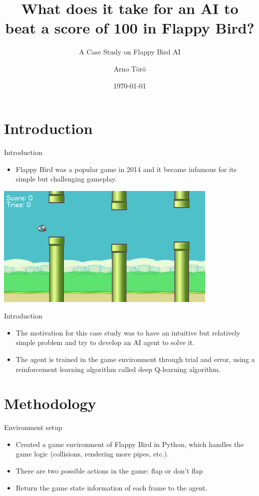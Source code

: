 \documentclass[xcolor=dvipsnames]{beamer}
\title[A Case Study on Flappy Bird AI]{What does it take for an AI to beat a score of 100 in Flappy Bird?}
\subtitle{A Case Study on Flappy Bird AI}
\author{Arno Törö}
\date{\today}
\institute[]{LUT University}
\begin{document}
\begin{frame}
    \titlepage
\end{frame}

\begin{frame}
    \tableofcontents
\end{frame}


\section{Introduction}
\begin{frame}{Introduction}
    \begin{itemize}
        \item Flappy Bird was a popular game in 2014 and it became infamous for its simple but challenging gameplay.
    \end{itemize}
    \begin{center}
        \vspace{0.3cm} %
        \includegraphics[width=0.8\textwidth]{resources/flappy_bird.png}
    \end{center}
\end{frame}

\begin{frame}{Introduction}
    \begin{itemize}
        \item The motivation for this case study was to have an intuitive but relatively simple problem and try to develop an AI agent to solve it.
        \item The agent is trained in the game environment through trial and error, using a reinforcement learning algorithm called deep Q-learning algorithm.
    \end{itemize}
\end{frame}




\section{Methodology}
\begin{frame}{Environment setup}
    \begin{itemize}
        \item Created a game environment of Flappy Bird in Python, which handles the game logic (collisions, rendering more pipes, etc.).
        \item There are two possible actions in the game: flap or don't flap
        \item Return the game state information of each frame to the agent.
    \end{itemize}
\end{frame}
\end{document}
